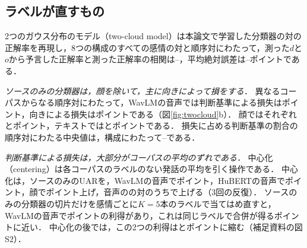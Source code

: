 \subsection{ラベルが直すもの}
\label{sec:part1-fix}

2つのガウス分布のモデル（two-cloud model）は本論文で学習した分類器の対の正解率を再現し，8つの構成のすべての感情の対と順序対にわたって，測った$d$と$o$から予言した正解率と測った正解率の相関は--，平均絶対誤差は--ポイントである．

\emph{ソースのみの分類器は，顔を除いて，主に向きによって損をする．}
異なるコーパスからなる順序対にわたって，WavLMの音声では判断基準による損失はポイント，向きによる損失はポイントである（図\ref{fig:twocloud}b）．
顔ではそれぞれとポイント，テキストではとポイントである．
損失に占める判断基準の割合の順序対にわたる中央値は，構成にわたって--である．

\emph{判断基準による損失は，大部分がコーパスの平均のずれである．}
中心化（centering）は各コーパスのラベルのない発話の平均を引く操作である．
中心化は，ソースのみのUARを，WavLMの音声でポイント，HuBERTの音声でポイント，顔でポイント上げ，音声のの対のうちで上げる（3回の反復）．
ソースのみの分類器の切片だけを感情ごとに$K=5$本のラベルで当てはめ直すと，WavLMの音声でポイントの利得があり，これは同じラベルで合併が得るポイントに近い．
中心化の後では，この2つの利得はとポイントに縮む（補足資料の図S2）．

